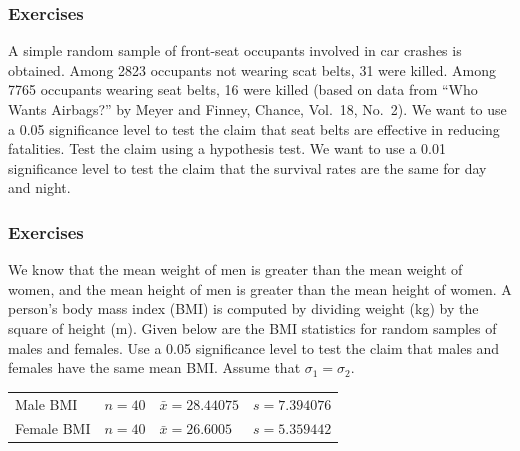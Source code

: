 \documentclass[xcolor=dvipsnames]{beamer}
\begin{document}
\begin{frame}
  \frametitle{Exercises}
{\ubung} A simple random sample of front-seat
occupants involved in car crashes is obtained. Among 2823 occupants
not wearing scat belts, 31 were killed. Among 7765 occupants wearing
seat belts, 16 were killed (based on data from ``Who Wants Airbags?'' by
Meyer and Finney, Chance, Vol.\ 18, No.\ 2). We want to use a 0.05
significance level to test the claim that seat belts are effective in
reducing fatalities. Test the claim using a hypothesis test. We want
to use a 0.01 significance level to test the claim that the survival
rates are the same for day and night.
\end{frame}




\begin{frame}
  \frametitle{Exercises}
{\ubung} We know that the mean weight of men is
greater than the mean weight of women, and the mean height of men is
greater than the mean height of women. A person's body mass index
(BMI) is computed by dividing weight (kg) by the square of height (m).
Given below are the BMI statistics for random samples of males and
females. Use a 0.05 significance level to test the claim that males
and females have the same mean BMI. Assume that $\sigma_{1}=\sigma_{2}$.

\medskip

\begin{tabular}{llll}
  Male BMI & $n=40$ & $\bar{x}=28.44075$ & $s=7.394076$ \\ 
  Female BMI & $n=40$ & $\bar{x}=26.6005$ & $s=5.359442$ \\
\end{tabular}
\end{frame}
\end{document}
